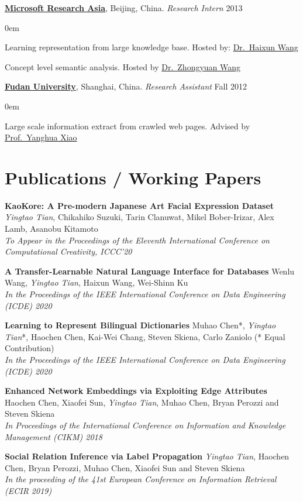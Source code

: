 \documentclass[line,margin]{cv}
\newenvironment{block}
{
	\begin{addmargin}[2em]{0em}%
}
{
	\end{addmargin}
}
\newcommand{\Fudan}{\href{http://www.fudan.edu.cn/englishnew/}{Fudan University}}
\newcommand{\MSRA}{\href{http://research.microsoft.com/en-us/labs/asia/default.aspx}{Microsoft Research Asia}}
\newcommand{\Haixun}{\href{http://haixun.olidu.com/}{Dr.\ Haixun Wang}}
\newcommand{\Zhongyuan}{\href{http://research.microsoft.com/en-us/people/zhowang/}{Dr.\ Zhongyuan Wang}}
\newcommand{\Yanghua}{\href{http://gdm.fudan.edu.cn/GDMWiki/Wiki.jsp?page=Yanghuaxiao}{Prof.\ Yanghua Xiao}}
\begin{document}
\begin{resume}
	{\bf \MSRA}, Beijing, China. {\itshape Research Intern} \hfill 2013

	\begin{block}
		Learning representation from large knowledge base. Hosted by: \Haixun

		Concept level semantic analysis. Hosted by \Zhongyuan
	\end{block}

	{\bf \Fudan}, Shanghai, China. {\itshape Research Assistant} \hfill Fall 2012
	\begin{block}
		Large scale information extract from crawled web pages. Advised by \Yanghua
	\end{block}


\section{Publications / Working Papers}
	{\bf  KaoKore: A Pre-modern Japanese Art Facial Expression Dataset}
	\emph{Yingtao Tian}, Chikahiko Suzuki, Tarin Clanuwat, Mikel Bober-Irizar, Alex Lamb, Asanobu Kitamoto\\
	\emph{To Appear in the Proceedings of the Eleventh International Conference on Computational Creativity, ICCC'20}

	{\bf  A Transfer-Learnable Natural Language Interface for Databases}
	Wenlu Wang, \emph{Yingtao Tian}, Haixun Wang, Wei-Shinn Ku\\
	\emph{In the Proceedings of the IEEE International Conference on Data Engineering (ICDE) 2020}
	
	{\bf  Learning to Represent Bilingual Dictionaries}
	Muhao Chen*, \emph{Yingtao Tian}*, Haochen Chen, Kai-Wei Chang, Steven Skiena, Carlo Zaniolo  (* Equal Contribution)\\
	\emph{In the Proceedings of the IEEE International Conference on Data Engineering (ICDE) 2020}
	
	{\bf  Enhanced Network Embeddings via Exploiting Edge Attributes}
	 Haochen Chen, Xiaofei Sun, \emph{Yingtao Tian}, Muhao Chen, Bryan Perozzi and Steven Skiena\\
	\emph{In Proceedings of the International Conference on Information and Knowledge Management (CIKM) 2018}

	{\bf Social Relation Inference via Label Propagation}
	\emph{Yingtao Tian}, Haochen Chen, Bryan Perozzi, Muhao Chen, Xiaofei Sun and Steven Skiena\\
	\emph{In the proceeding of the 41st European Conference on Information Retrieval (ECIR 2019)}
	

\end{resume}
\end{document}
